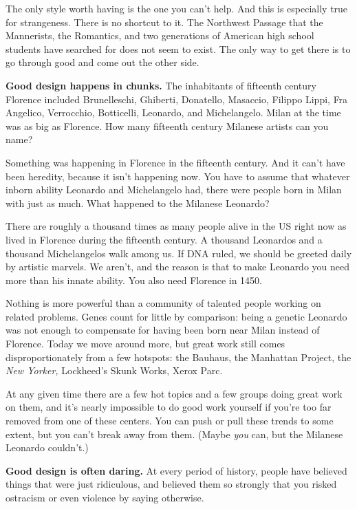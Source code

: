 The only style worth having is the one you can't help.
And this is especially true for strangeness.  There is no
shortcut to it.  The Northwest Passage that the Mannerists,
the Romantics, and two generations of American high school
students have searched for does not seem to exist.  The
only way to get there is to go through good and come out
the other side.




\textbf{Good design happens in chunks.}  The inhabitants
of fifteenth century Florence included Brunelleschi, Ghiberti,
Donatello, Masaccio, Filippo Lippi, 
Fra Angelico, Verrocchio, Botticelli, Leonardo, and Michelangelo.
Milan at the time was as big as Florence.
How many fifteenth century Milanese artists can you name?

Something was happening in Florence in the fifteenth century.
And it can't have been heredity, because it isn't happening now.
You have to assume that whatever
inborn ability Leonardo and Michelangelo had, there were
people born in Milan with just as much.  What happened to
the Milanese Leonardo?

There are roughly a thousand times
as many people alive in the US right now as lived in
Florence during the fifteenth century.  A thousand Leonardos
and a thousand Michelangelos walk among us.
If DNA ruled, we should be greeted daily by artistic
marvels.  We aren't, and the reason is that to make Leonardo
you need more than his innate ability.  You also need Florence 
in 1450.

Nothing is more powerful
than a community of talented people working on related
problems.  Genes count for little by comparison: being a genetic
Leonardo was not enough to compensate for having been born   
near Milan instead of Florence.
Today we move around more, but great work still comes
disproportionately from a few hotspots:
the Bauhaus, the Manhattan Project, the \emph{New Yorker,}
Lockheed's Skunk Works, Xerox Parc.

At any given time there are a
few hot topics and a few groups doing great work on them,
and it's nearly impossible to do
good work yourself if you're too far removed from one
of these centers.  You can push or pull these trends
to some extent, but you can't break away from them.
(Maybe \emph{you} can, but the Milanese Leonardo couldn't.)




\textbf{Good design is often daring.}  At every period   
of history, people have believed things that were just   
ridiculous, and believed them so strongly that you risked  
ostracism or even violence by saying otherwise.

